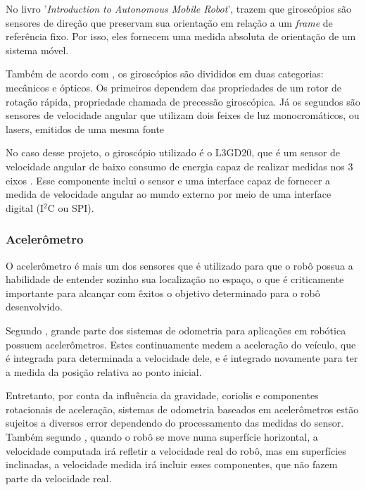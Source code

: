 \documentclass[acronym, symbols]{fei}
\begin{document}
				No livro '\textit{Introduction to Autonomous Mobile Robot}', \textcite{siegwart2011introduction} trazem que giroscópios são sensores de direção que preservam sua orientação em relação a um \textit{frame} de referência fixo. Por isso, eles fornecem uma medida absoluta de orientação de um sistema móvel. 
				
				Também de acordo com \textcite{siegwart2011introduction}, os giroscópios são divididos em duas categorias: mecânicos e ópticos. Os primeiros dependem das propriedades de um rotor de rotação rápida, propriedade chamada de precessão giroscópica. Já os segundos são sensores de velocidade angular que utilizam dois feixes de luz monocromáticos, ou lasers, emitidos de uma mesma fonte
				
				No caso desse projeto, o giroscópio utilizado é o L3GD20, que é um sensor de velocidade angular de baixo consumo de energia capaz de realizar medidas nos 3 eixos \cite{datasheet_gyro}. Esse componente inclui o sensor e uma interface capaz de fornecer a medida de velocidade angular ao mundo externo por meio de uma interface digital (I$^2$C ou SPI).
			
			\subsubsection{Acelerômetro}
			
				O acelerômetro é mais um dos sensores que é utilizado para que o robô possua a habilidade de entender sozinho sua localização no espaço, o que é criticamente importante para alcançar com êxitos o objetivo determinado para o robô desenvolvido.
			
				Segundo \textcite{NISTLER2011413}, grande parte dos sistemas de odometria para aplicações em robótica possuem acelerômetros. Estes continuamente medem a aceleração do veículo, que é integrada para determinada a velocidade dele, e é integrado novamente para ter a medida da posição relativa ao ponto inicial.
				
				Entretanto, por conta da influência da gravidade, coriolis e componentes rotacionais de aceleração, sistemas de odometria baseados em acelerômetros estão sujeitos a diversos error dependendo do processamento das medidas do sensor. Também segundo \textcite{NISTLER2011413}, quando o robô se move numa superfície horizontal, a velocidade computada irá refletir a velocidade real do robô, mas em superfícies inclinadas, a velocidade medida irá incluir esses componentes, que não fazem parte da velocidade real.
			
\end{document}
